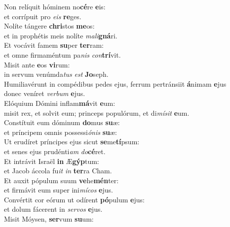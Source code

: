\evenverse Non relíquit hóminem no\textbf{cé}re \textbf{e}is:~\*\\
\evenverse et corrípuit pro \textit{e}\textit{is} \textbf{re}ges.\\
\oddverse Nolíte tángere \textbf{chri}stos \textbf{me}os:~\*\\
\oddverse et in prophétis meis nolíte \textit{ma}\textit{li}\textbf{gná}ri.\\
\evenverse Et vocávit famem \textbf{su}per \textbf{ter}ram:~\*\\
\evenverse et omne firmaméntum pa\textit{nis} \textit{con}\textbf{trí}vit.\\
\oddverse Misit ante \textbf{e}os \textbf{vi}rum:~\*\\
\oddverse in servum venúmda\textit{tus} \textit{est} \textbf{Jo}seph.\\
\evenverse Humiliavérunt in compédibus pedes ejus, ferrum pertránsiit \textbf{á}nimam \textbf{e}jus~\*\\
\evenverse donec veníret \textit{ver}\textit{bum} \textbf{e}jus.\\
\oddverse Elóquium Dómini inflam\textbf{má}vit \textbf{e}um:~\*\\
\oddverse misit rex, et solvit eum; princeps populórum, et di\textit{mí}\textit{sit} \textbf{e}um.\\
\evenverse Constítuit eum dóminum \textbf{do}mus \textbf{su}æ:~\*\\
\evenverse et príncipem omnis possessi\textit{ó}\textit{nis} \textbf{su}æ:\\
\oddverse Ut erudíret príncipes ejus sicut \textbf{se}me\textbf{tí}psum:~\*\\
\oddverse et senes ejus prudénti\textit{am} \textit{do}\textbf{cé}ret.\\
\evenverse Et intrávit Israël \textbf{in} Æ\textbf{gýp}tum:~\*\\
\evenverse et Jacob áccola fu\textit{it} \textit{in} \textbf{ter}ra Cham.\\
\oddverse Et auxit pópulum suum \textbf{ve}he\textbf{mén}ter:~\*\\
\oddverse et firmávit eum super ini\textit{mí}\textit{cos} \textbf{e}jus.\\
\evenverse Convértit cor eórum ut odírent \textbf{pó}pulum \textbf{e}jus:~\*\\
\evenverse et dolum fácerent in \textit{ser}\textit{vos} \textbf{e}jus.\\
\oddverse Misit Móysen, \textbf{ser}vum \textbf{su}um:~\*\\
